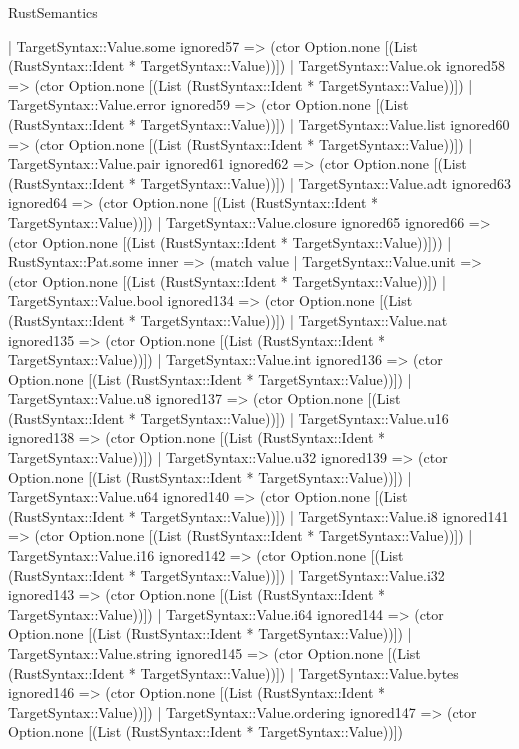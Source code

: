 \begin{lexlean}{RustSemantics}
\begin{semanticmodule}
{      | TargetSyntax::Value.some ignored57 => (ctor Option.none [(List (RustSyntax::Ident * TargetSyntax::Value))])
      | TargetSyntax::Value.ok ignored58 => (ctor Option.none [(List (RustSyntax::Ident * TargetSyntax::Value))])
      | TargetSyntax::Value.error ignored59 => (ctor Option.none [(List (RustSyntax::Ident * TargetSyntax::Value))])
      | TargetSyntax::Value.list ignored60 => (ctor Option.none [(List (RustSyntax::Ident * TargetSyntax::Value))])
      | TargetSyntax::Value.pair ignored61 ignored62 => (ctor Option.none [(List (RustSyntax::Ident * TargetSyntax::Value))])
      | TargetSyntax::Value.adt ignored63 ignored64 => (ctor Option.none [(List (RustSyntax::Ident * TargetSyntax::Value))])
      | TargetSyntax::Value.closure ignored65 ignored66 => (ctor Option.none [(List (RustSyntax::Ident * TargetSyntax::Value))]))
    | RustSyntax::Pat.some inner => (match value
      | TargetSyntax::Value.unit => (ctor Option.none [(List (RustSyntax::Ident * TargetSyntax::Value))])
      | TargetSyntax::Value.bool ignored134 => (ctor Option.none [(List (RustSyntax::Ident * TargetSyntax::Value))])
      | TargetSyntax::Value.nat ignored135 => (ctor Option.none [(List (RustSyntax::Ident * TargetSyntax::Value))])
      | TargetSyntax::Value.int ignored136 => (ctor Option.none [(List (RustSyntax::Ident * TargetSyntax::Value))])
      | TargetSyntax::Value.u8 ignored137 => (ctor Option.none [(List (RustSyntax::Ident * TargetSyntax::Value))])
      | TargetSyntax::Value.u16 ignored138 => (ctor Option.none [(List (RustSyntax::Ident * TargetSyntax::Value))])
      | TargetSyntax::Value.u32 ignored139 => (ctor Option.none [(List (RustSyntax::Ident * TargetSyntax::Value))])
      | TargetSyntax::Value.u64 ignored140 => (ctor Option.none [(List (RustSyntax::Ident * TargetSyntax::Value))])
      | TargetSyntax::Value.i8 ignored141 => (ctor Option.none [(List (RustSyntax::Ident * TargetSyntax::Value))])
      | TargetSyntax::Value.i16 ignored142 => (ctor Option.none [(List (RustSyntax::Ident * TargetSyntax::Value))])
      | TargetSyntax::Value.i32 ignored143 => (ctor Option.none [(List (RustSyntax::Ident * TargetSyntax::Value))])
      | TargetSyntax::Value.i64 ignored144 => (ctor Option.none [(List (RustSyntax::Ident * TargetSyntax::Value))])
      | TargetSyntax::Value.string ignored145 => (ctor Option.none [(List (RustSyntax::Ident * TargetSyntax::Value))])
      | TargetSyntax::Value.bytes ignored146 => (ctor Option.none [(List (RustSyntax::Ident * TargetSyntax::Value))])
      | TargetSyntax::Value.ordering ignored147 => (ctor Option.none [(List (RustSyntax::Ident * TargetSyntax::Value))])
}
\end{semanticmodule}
\end{lexlean}
